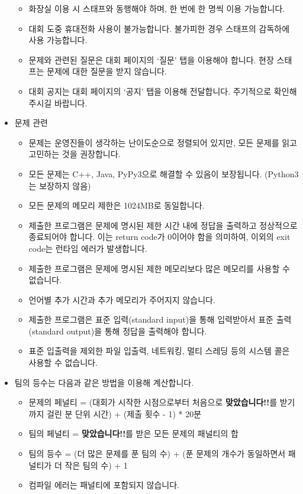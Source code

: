 \begin{itemize}[noitemsep]
\begin{itemize}[noitemsep]
        \item 화장실 이용 시 스태프와 동행해야 하며, 한 번에 한 명씩 이용 가능합니다.
        \item 대회 도중 휴대전화 사용이 불가능합니다. 불가피한 경우 스태프의 감독하에 사용 가능합니다.
        \item 문제와 관련된 질문은 대회 페이지의 `질문' 탭을 이용해야 합니다. 현장 스태프는 문제에 대한 질문을 받지 않습니다.
        \item 대회 공지는 대회 페이지의 `공지' 탭을 이용해 전달합니다. 주기적으로 확인해 주시길 바랍니다.
    \end{itemize}

    \item 문제 관련

    \begin{itemize}[noitemsep]
        \item 문제는 운영진들이 생각하는 난이도순으로 정렬되어 있지만, 모든 문제를 읽고 고민하는 것을 권장합니다.
        \item 모든 문제는 C++, Java, PyPy3으로 해결할 수 있음이 보장됩니다. (Python3는 보장하지 않음)
        \item 모든 문제의 메모리 제한은 1024MB로 동일합니다.
        \item 제출한 프로그램은 문제에 명시된 제한 시간 내에 정답을 출력하고 정상적으로 종료되어야 합니다. 이는 return code가 0이어야 함을 의미하여, 이외의 exit code는 런타임 에러가 발생합니다.
        \item 제출한 프로그램은 문제에 명시된 제한 메모리보다 많은 메모리를 사용할 수 없습니다.
        \item 언어별 추가 시간과 추가 메모리가 주어지지 않습니다.
        \item 제출한 프로그램은 표준 입력(standard input)을 통해 입력받아서 표준 출력(standard output)을 통해 정답을 출력해야 합니다.
        \item 표준 입출력을 제외한 파일 입출력, 네트워킹, 멀티 스레딩 등의 시스템 콜은 사용할 수 없습니다.
    \end{itemize}

    \pagebreak

    \item 팀의 등수는 다음과 같은 방법을 이용해 계산합니다.

    \begin{itemize}[noitemsep]
        \item 문제의 페널티 = (대회가 시작한 시점으로부터 처음으로 \textbf{\textcolor{acgreen}{맞았습니다!!}}를 받기까지 걸린 분 단위 시간) + (제출 횟수 - 1) * 20분
        \item 팀의 페널티 = \textbf{\textcolor{acgreen}{맞았습니다!!}}를 받은 모든 문제의 패널티의 합
        \item 팀의 등수 = (더 많은 문제를 푼 팀의 수) + (푼 문제의 개수가 동일하면서 패널티가 더 작은 팀의 수) + 1
        \item 컴파일 에러는 패널티에 포함되지 않습니다.
    \end{itemize}


\end{itemize}
